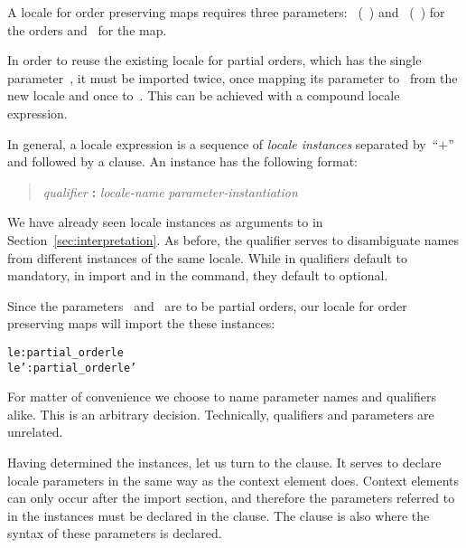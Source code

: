 \begin{isabellebody}
\begin{isamarkuptext}
  A locale for order preserving maps requires three parameters: ~(~\isa{{\isasymsqsubseteq}}) and ~(~\isa{{\isasympreceq}}) for the orders and~\isa{{\isasymphi}}
  for the map.

  In order to reuse the existing locale for partial orders, which has
  the single parameter~, it must be imported twice, once
  mapping its parameter to~ from the new locale and once
  to~.  This can be achieved with a compound locale
  expression.

  In general, a locale expression is a sequence of \emph{locale instances}
  separated by~``$\textbf{+}$'' and followed by a 
  clause.
  An instance has the following format:
\begin{quote}
  \textit{qualifier} \textbf{:} \textit{locale-name}
  \textit{parameter-instantiation}
\end{quote}
  We have already seen locale instances as arguments to
   in Section~\ref{sec:interpretation}.
  As before, the qualifier serves to disambiguate names from
  different instances of the same locale.  While in
   qualifiers default to mandatory, in
  import and in the  command, they default to
  optional.

  Since the parameters~ and~ are to be partial
  orders, our locale for order preserving maps will import the these
  instances:
\begin{small}
\begin{alltt}
  le: partial_order le
  le': partial_order le'
\end{alltt}
\end{small}
  For matter of convenience we choose to name parameter names and
  qualifiers alike.  This is an arbitrary decision.  Technically, qualifiers
  and parameters are unrelated.

  Having determined the instances, let us turn to the 
  clause.  It serves to declare locale parameters in the same way as
  the context element  does.  Context elements can
  only occur after the import section, and therefore the parameters
  referred to in the instances must be declared in the 
  clause.  The  clause is also where the syntax of these
  parameters is declared.


\end{isamarkuptext}
\end{isabellebody}
